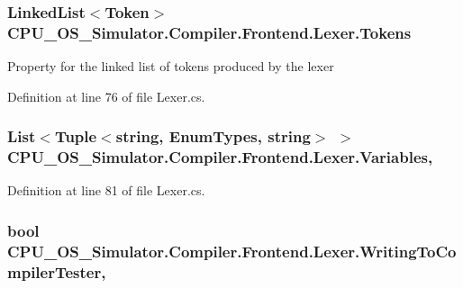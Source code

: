 \subsubsection[{Tokens}]{\setlength{\rightskip}{0pt plus 5cm}Linked\+List$<${\bf Token}$>$ C\+P\+U\+\_\+\+O\+S\+\_\+\+Simulator.\+Compiler.\+Frontend.\+Lexer.\+Tokens\hspace{0.3cm}{\ttfamily [get]}}\label{class_c_p_u___o_s___simulator_1_1_compiler_1_1_frontend_1_1_lexer_a08611849f2bad0c53f5707d15dbdc840}


Property for the linked list of tokens produced by the lexer 



Definition at line 76 of file Lexer.\+cs.

\hypertarget{class_c_p_u___o_s___simulator_1_1_compiler_1_1_frontend_1_1_lexer_abb832df2e4dc0a135eca9e20aeafc25f}{}
\subsubsection[{Variables}]{\setlength{\rightskip}{0pt plus 5cm}List$<$Tuple$<$string, {\bf Enum\+Types}, string$>$ $>$ C\+P\+U\+\_\+\+O\+S\+\_\+\+Simulator.\+Compiler.\+Frontend.\+Lexer.\+Variables\hspace{0.3cm}{\ttfamily [get]}, {\ttfamily [set]}}\label{class_c_p_u___o_s___simulator_1_1_compiler_1_1_frontend_1_1_lexer_abb832df2e4dc0a135eca9e20aeafc25f}


Definition at line 81 of file Lexer.\+cs.

\hypertarget{class_c_p_u___o_s___simulator_1_1_compiler_1_1_frontend_1_1_lexer_ab036c4c1dbff32b7a8a54d58f4c4195c}{}
\subsubsection[{Writing\+To\+Compiler\+Tester}]{\setlength{\rightskip}{0pt plus 5cm}bool C\+P\+U\+\_\+\+O\+S\+\_\+\+Simulator.\+Compiler.\+Frontend.\+Lexer.\+Writing\+To\+Compiler\+Tester\hspace{0.3cm}{\ttfamily [get]}, {\ttfamily [set]}}\label{class_c_p_u___o_s___simulator_1_1_compiler_1_1_frontend_1_1_lexer_ab036c4c1dbff32b7a8a54d58f4c4195c}



